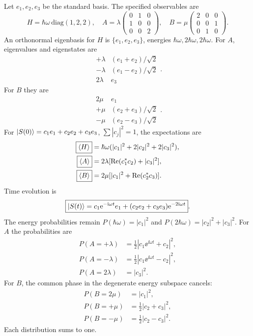 Let $e_1,e_2,e_3$ be the standard basis.
The specified observables are
\begin{equation}
H=\hbar\omega\,\mathrm{diag}(1,2,2),\quad
A=\lambda\begin{pmatrix}0&1&0\\1&0&0\\0&0&2\end{pmatrix},\quad
B=\mu\begin{pmatrix}2&0&0\\0&0&1\\0&1&0\end{pmatrix}.
\end{equation}
An orthonormal eigenbasis for $H$ is
$\{e_1,e_2,e_3\}$, energies
$\hbar\omega,2\hbar\omega,2\hbar\omega$.
For $A$, eigenvalues and eigenstates are
\begin{equation}
\begin{array}{c|c}
+\lambda&(e_1+e_2)/\sqrt2\\
-\lambda&(e_1-e_2)/\sqrt2\\
2\lambda&e_3
\end{array}.
\end{equation}
For $B$ they are
\begin{equation}
\begin{array}{c|c}
2\mu&e_1\\
+\mu&(e_2+e_3)/\sqrt2\\
-\mu&(e_2-e_3)/\sqrt2
\end{array}.
\end{equation}
For $\left|S(0)\right\rangle=c_1e_1+c_2e_2+c_3e_3$,
$\sum|c_j|^2=1$, the expectations are
\begin{align}
\boxed{\left\langle H\right\rangle}&=\hbar\omega
(|c_1|^2+2|c_2|^2+2|c_3|^2),\\
\boxed{\left\langle A\right\rangle}&=2\lambda
[\operatorname{Re}(c_1^*c_2)+|c_3|^2],\\
\boxed{\left\langle B\right\rangle}&=2\mu
[|c_1|^2+\operatorname{Re}(c_2^*c_3)].
\end{align}
Time evolution is
\begin{equation}
\boxed{\left|S(t)\right\rangle=
c_1\mathrm{e}^{-\mathrm{i}\omega t}e_1+
(c_2e_2+c_3e_3)\mathrm{e}^{-2\mathrm{i}\omega t}}.
\end{equation}
The energy probabilities remain
$P(\hbar\omega)=|c_1|^2$ and
$P(2\hbar\omega)=|c_2|^2+|c_3|^2$.
For $A$ the probabilities are
\begin{align}
P(A=+\lambda)&=\tfrac12|c_1\ee^{\ii\omega t}+c_2|^2,\\
P(A=-\lambda)&=\tfrac12|c_1\ee^{\ii\omega t}-c_2|^2,\\
P(A=2\lambda)&=|c_3|^2.
\end{align}
For $B$, the common phase in the
degenerate energy subspace cancels:
\begin{align}
P(B=2\mu)&=|c_1|^2,\\
P(B=+\mu)&=\tfrac12|c_2+c_3|^2,\\
P(B=-\mu)&=\tfrac12|c_2-c_3|^2.
\end{align}
Each distribution sums to one.

